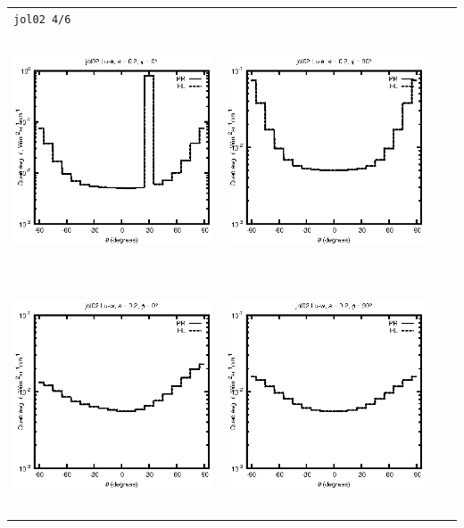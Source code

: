 \begin{tabular}{c c c c}
\multicolumn{4}{l}{\texttt{jol02 4/6}} \\
\includegraphics[height=7cm]{../eps/jol02_Lu_a_fwd.eps} &
\includegraphics[height=7cm]{../eps/jol02_Lu_a_cross.eps}\\
\includegraphics[height=7cm]{../eps/jol02_Lu_w_fwd.eps} &
\includegraphics[height=7cm]{../eps/jol02_Lu_w_cross.eps} \\

\end{tabular}
